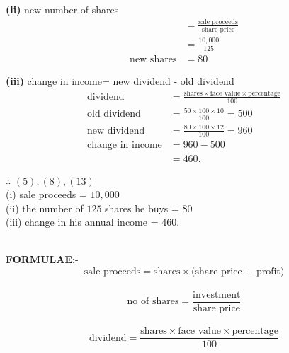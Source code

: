 \documentclass[journal,12pt,twocolumn]{IEEEtran}
\begin{document}
\medskip

\textbf{(ii)}
new number of shares
\begin{align}
&=\frac{\text{sale proceeds}}{\text{share price}}\\
&=\frac{10,000}{125}\\
\text{new shares}&=80
\end{align}

\medskip

\textbf{(iii)} 
change in income= new dividend - old dividend\\
\begin{align}
\text{dividend}&=\frac{\text{shares} \times \text{face value} \times \text{percentage}}{100}\\
\text{old dividend}&=\frac{50 \times 100 \times 10}{100} =500\\
\text{new dividend}&=\frac{80 \times 100 \times 12}{100} =960\\
\text{change in income}&=960-500\\
&=460.
\end{align}

$\therefore$  $ (5),(8),(13)$\\
\hspace*{1cm} (i) sale proceeds = \rupee$10,000$\\
\hspace*{1cm} (ii) the number of \rupee$125$ shares he buys = $80$\\
\hspace*{1cm} (iii) change in his annual income = \rupee$460$.\\

\begin{table}[ht!]
    
\end{table}\\

\textbf{FORMULAE}:-\\
 \hspace*{1cm} $$\text{sale proceeds} = \text{shares} \times \text{(share price + profit)}$$\\
 \hspace*{1cm} $$\text{no of shares} = \frac{\text{investment}}{\text{share price}}$$ \\
 \hspace*{1cm} $$\text{dividend} = \frac{\text{shares} \times \text{face value} \times \text{percentage}}{100}$$ \\
 
\end{document}

